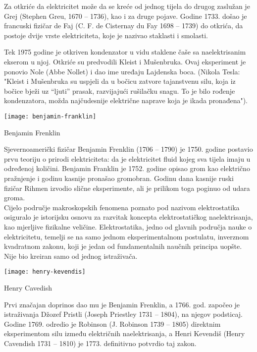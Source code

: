 	Za otkriće da elektricitet može da se kreće od jednog tijela do drugog zaslužan je Grej (Stephen Greu, 1670 – 1736), kao i za druge pojave. Godine 1733. došao je francuski fizičar de Faj (C. F. de Cisternay du Fay 1698 – 1739) do otkrića, da postoje dvije vrste elektriciteta, koje je nazivao staklasti i smolasti. 
	
	Tek 1975 godine je otkriven kondenzator u vidu staklene čaše sa naelektrisanim ekserom u njoj. Otkriće su predvodili Kleist i Mušenbruka. Ovaj eksperiment je ponovio Nole (Abbe Nollet) i dao ime uređaju Lajdenska boca. (Nikola Tesla: "Kleist i Mušenbruka su uspjeli da u bočicu zatvore tajanstvenu silu, koja iz bočice	bježi uz “ljuti” prasak, razvijajući rušilačku snagu. To je bilo rođenje kondenzatora, možda najčudesnije električne naprave koja je ikada pronađena").
	\begin{marginfigure}%
		\texttt{[image: benjamin-franklin]}
		\caption{Benjamin Frenklin}
		\label{fig:benjamin-franklin}
	\end{marginfigure} 
	Sjevernoamerički fizičar Benjamin Frenklin (1706 – 1790) je 1750. godine postavio
	prvu teoriju o prirodi elektriciteta: da je elektricitet fluid kojeg sva tijela imaju u određenoj količini. Benjamin Franklin je 1752. godine opisao grom kao električno pražnjenje i godinu kasnije pronašao gromobran. Godinu dana kasnije ruski fizičar Rihmen izvodio slične eksperimente, ali je prilikom toga poginuo od udara groma.\\
	Cijelo područje makroskopskih fenomena poznato pod nazivom elektrostatika osiguralo je istorijsku osnovu za razvitak koncepta elektrostatičkog naelektrisanja, kao mjerljive fizikalne veličine. Elektrostatika, jedno od glavnih područja nauke o elektricitetu, temelji se na samo jednom eksperimentalnom postulatu, inverznom kvadratnom zakonu, koji je jedan od fundamentalnih naučnih principa uopšte. Nije bio kreiran samo od jednog istraživača. 
	
	\begin{marginfigure}%
		\texttt{[image: henry-kevendis]}
		\caption{Henry Cavedish}
		\label{fig:kevendis}
	\end{marginfigure} 
	Prvi značajan doprinos dao mu je Benjamin Frenklin, a 1766. god. započeo je istraživanja Džozef Pristli (Joseph Priestley 1731 – 1804), na njegov podsticaj. Godine 1769. odredio je Robinson (J. Robinson 1739 – 1805) direktnim eksperimentom silu između električnih naelektrisanja, a Henri Kevendiš (Henry Cavendish 1731 – 1810) je 1773. definitivno potvrdio taj zakon. \\

